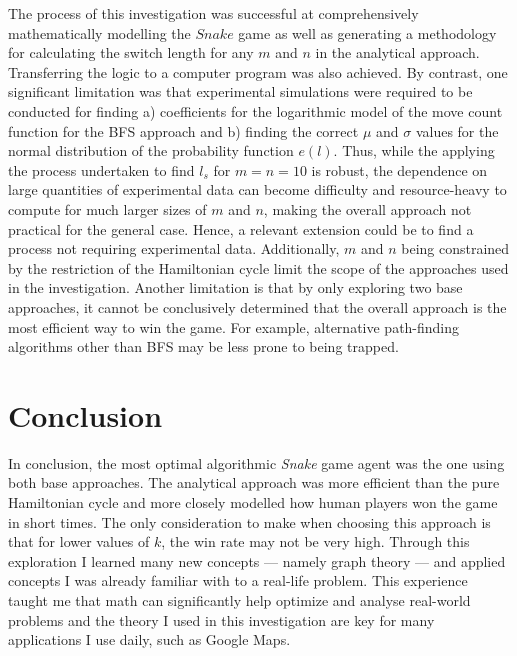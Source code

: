 \documentclass[12pt]{article}
\begin{document}
The process of this investigation was successful at comprehensively mathematically modelling the $Snake$ game as well as generating a methodology for calculating the switch length for any $m$ and $n$ in the analytical approach. Transferring the logic to a computer program was also achieved. By contrast, one significant limitation was that experimental simulations were required to be conducted for finding a) coefficients for the logarithmic model of the move count function for the BFS approach and b) finding the correct $\mu$ and $\sigma$ values for the normal distribution of the probability function $e(l)$. Thus, while the applying the process undertaken to find $l_s$ for $m=n=10$ is robust, the dependence on large quantities of experimental data can become difficulty and resource-heavy to compute for much larger sizes of $m$ and $n$, making the overall approach not practical for the general case. Hence, a relevant extension could be to find a process not requiring experimental data. Additionally, $m$ and $n$ being constrained by the restriction of the Hamiltonian cycle limit the scope of the approaches used in the investigation. Another limitation is that by only exploring two base approaches, it cannot be conclusively determined that the overall approach is the most efficient way to win the game. For example, alternative path-finding algorithms other than BFS may be less prone to being trapped.

\section{Conclusion}

In conclusion, the most optimal algorithmic \textit{Snake} game agent was the one using both base approaches. The analytical approach was more efficient than the pure Hamiltonian cycle and more closely modelled how human players won the game in short times. The only consideration to make when choosing this approach is that for lower values of $k$, the win rate may not be very high. Through this exploration I learned many new concepts — namely graph theory — and applied concepts I was already familiar with to a real-life problem. This experience taught me that math can significantly help optimize and analyse real-world problems and the theory I used in this investigation are key for many applications I use daily, such as Google Maps.
\end{document}
